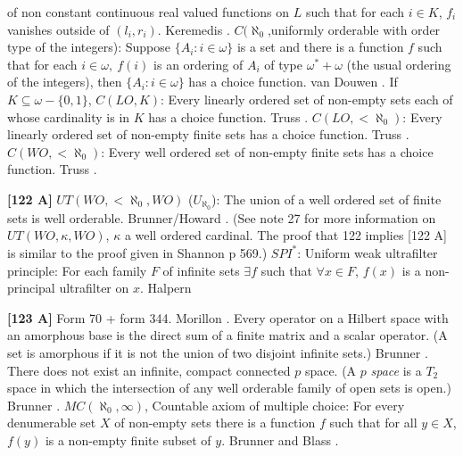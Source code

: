 of non constant continuous real valued functions on $L$ such that
for each $i\in K$, $f_i$ vanishes outside of $(l_i,r_i)$. \ac{Keremedis}
\cite{1997}.
\medskip
{} $C(\aleph_{0}$,uniformly orderable with order type
of the integers): Suppose $\{ A_{i}: i\in\omega\}$ is a set and there is a
function $f$ such that for each $i\in\omega,\ f(i)$ is an ordering of
$A_{i}$ of type $\omega^{*}+\omega$ (the usual ordering of the integers),
then $\{A_{i}: i\in\omega\}$ has a choice function. van \ac{Douwen}
\cite{1985}.
\medskip
{} If $K\subseteq\omega-\{0,1\}$, $C(LO,K)$:
Every linearly ordered set of non-empty sets each of whose cardinality
is in $K$ has a choice function.  \ac{Truss} \cite{1973a}.
\medskip
{} $C(LO,<\aleph_{0})$: Every linearly ordered set of
non-empty finite sets has a choice function.  \ac{Truss} \cite{1973a}.
\medskip
{} $C(WO,<\aleph_{0})$: Every well ordered set of
non-empty finite sets has a choice function.  \ac{Truss} \cite{1973a}.
\smallskip
\item{}{\bf [122 A]} $UT(WO,<\aleph_{0},WO)$ ($U_{\aleph_{0}}$): The
union of a well ordered set of finite sets is well orderable.
\ac{Brunner/Howard} \cite{1992}. (See note 27 for more information on
$UT(WO,\kappa ,WO)$, $\kappa$ a well ordered cardinal. The proof that
122 implies [122 A] is similar to the proof given in
\ac{Shannon} \cite{1988} p 569.)
\medskip
{} $SPI^*$: Uniform weak ultrafilter principle: For
each family $F$ of infinite sets $\exists f$ such that $\forall x\in F$,
$f(x)$ is a non-principal ultrafilter on $x$. \ac{Halpern} \cite{1972}
\smallskip
\item{}{\bf [123 A]} Form 70 + form 344.  \ac{Morillon} \cite{1988}.
\medskip
{} Every operator on a Hilbert space with an
amorphous base is the direct sum of a finite matrix and  a  scalar
operator.  (A set is amorphous if it is not the union of two disjoint
infinite sets.)  \ac{Brunner} \cite{1984a}.
\medskip
{} There does not exist an infinite, compact connected
$p$ space. (A $p$ {\it space} is a $T_2$ space in which the intersection of
any well orderable family of open sets is open.) \ac{Brunner} \cite{1984c}.
\medskip
{} $MC(\aleph_0,\infty)$, Countable axiom of
multiple choice: For every denumerable set $X$ of non-empty sets there
is a function $f$ such that for all $y\in X$, $f(y)$ is a non-empty finite
subset of $y$. \ac{Brunner} \cite{1984d} and \ac{Blass} \cite{1979}.
